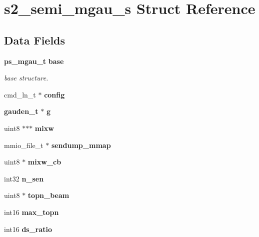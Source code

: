 \section{s2\-\_\-semi\-\_\-mgau\-\_\-s Struct Reference}
\label{structs2__semi__mgau__s}
\subsection*{Data Fields}
\begin{DoxyCompactItemize}
\item 
{\bf ps\-\_\-mgau\-\_\-t} {\bf base}
\begin{DoxyCompactList}\small\item\em base structure. \end{DoxyCompactList}\item 
cmd\-\_\-ln\-\_\-t $\ast$ {\bfseries config}\label{structs2__semi__mgau__s_ababf1e9522fb14c351df9a6b6d3957bc}

\item 
{\bf gauden\-\_\-t} $\ast$ {\bfseries g}\label{structs2__semi__mgau__s_ab9d5d5dcafa40af8869ceabb60a8d35b}

\item 
uint8 $\ast$$\ast$$\ast$ {\bfseries mixw}\label{structs2__semi__mgau__s_a1207b5db7e37e9477f3b55cc2d447050}

\item 
mmio\-\_\-file\-\_\-t $\ast$ {\bfseries sendump\-\_\-mmap}\label{structs2__semi__mgau__s_a66a60126fe057d36640cbf69f916bca3}

\item 
uint8 $\ast$ {\bfseries mixw\-\_\-cb}\label{structs2__semi__mgau__s_a20ec32cb8c38fb48909b2cc7c5412c3b}

\item 
int32 {\bfseries n\-\_\-sen}\label{structs2__semi__mgau__s_a021287621e71f8b74f23197d0efd1e9e}

\item 
uint8 $\ast$ {\bfseries topn\-\_\-beam}\label{structs2__semi__mgau__s_af530876b144ac13df103afe2ccdba2fc}

\item 
int16 {\bfseries max\-\_\-topn}\label{structs2__semi__mgau__s_adda80afc828a938dcdd08f976417d35a}

\item 
int16 {\bfseries ds\-\_\-ratio}\label{structs2__semi__mgau__s_a91b9da8bb484f4552ba0ff47cb262d17}


\end{DoxyCompactItemize}

